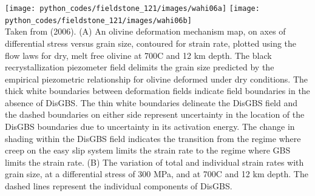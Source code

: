 \begin{center}
\texttt{[image: python\_codes/fieldstone\_121/images/wahi06a]}
\texttt{[image: python\_codes/fieldstone\_121/images/wahi06b]}\\
{\captionfont Taken from \textcite{wahi06} (2006).
(A) An olivine deformation mechanism map, on axes of
differential stress versus grain size, contoured for strain rate, plotted
using the flow laws for dry, melt free olivine at 700C and 12 km
depth. The black recrystallization piezometer field delimits
the grain size predicted by the empirical piezometric relationship for
olivine deformed under dry conditions. The thick white
boundaries between deformation fields indicate field boundaries in the
absence of DisGBS. The thin white boundaries delineate the DisGBS
field and the dashed boundaries on either side represent uncertainty in
the location of the DisGBS boundaries due to uncertainty in its
activation energy. The change in shading within the DisGBS field
indicates the transition from the regime where creep on the easy slip
system limits the strain rate to the regime where GBS limits the strain
rate. (B) The variation of total and individual strain rates with grain
size, at a differential stress of 300 MPa, and at 700C and 12 km depth.
The dashed lines represent the individual components of DisGBS.} 
\end{center}



